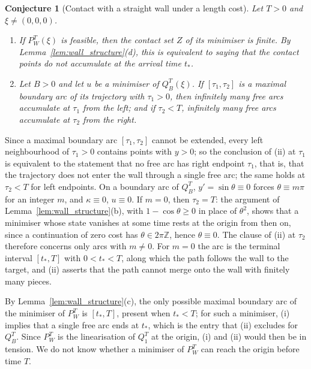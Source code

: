 \documentclass[11pt,reqno]{amsart}
\newtheorem{conjecture}[theorem]{Conjecture}
\theoremstyle{definition}
\numberwithin{equation}{section}
\begin{document}
\begin{conjecture}[Contact with a straight wall under a length cost]
\label{conj:wall_contact}
Let $T>0$ and $\xi\ne(0,0,0)$.
\begin{enumerate}
\item[(i)] If $P_W^T(\xi)$ is feasible, then the contact set $Z$ of its minimiser is finite. By
  Lemma~\ref{lem:wall_structure}(d), this is equivalent to saying that the contact points do not
  accumulate at the arrival time $t_*$.
\item[(ii)] Let $B>0$ and let $u$ be a minimiser of $Q_B^T(\xi)$. If $[\tau_1,\tau_2]$ is a
  \emph{maximal} boundary arc of its trajectory with $\tau_1>0$, then infinitely many free arcs
  accumulate at $\tau_1$ from the left; and if $\tau_2<T$, infinitely many free arcs accumulate at
  $\tau_2$ from the right.
\end{enumerate}
\end{conjecture}

Since a maximal boundary arc $[\tau_1,\tau_2]$ cannot be extended, every left neighbourhood of
$\tau_1>0$ contains points with $y>0$; so the conclusion of (ii) at $\tau_1$ is equivalent to the
statement that no free arc has right endpoint $\tau_1$, that is, that the trajectory does not enter the
wall through a single free arc; the same holds at $\tau_2<T$ for left endpoints. On a boundary arc of
$Q_B^T$, $y'=\sin\theta\equiv0$ forces $\theta\equiv m\pi$ for an integer $m$, and $\kappa\equiv0$,
$u\equiv0$. If $m=0$, then $\tau_2=T$: the argument of Lemma~\ref{lem:wall_structure}(b), with
$1-\cos\theta\ge0$ in place of $\theta^2$, shows that a minimiser whose state vanishes at some time
rests at the origin from then on, since a continuation of zero cost has $\theta\in2\pi\mathbb{Z}$,
hence $\theta\equiv0$. The clause of (ii) at $\tau_2$ therefore concerns only arcs with $m\ne0$. For
$m=0$ the arc is the terminal interval $[t_*,T]$ with $0<t_*<T$, along which the path follows the wall
to the target, and (ii) asserts that the path cannot merge onto the wall with finitely many pieces.

By Lemma~\ref{lem:wall_structure}(c), the only possible maximal boundary arc of the minimiser of
$P_W^T$ is $[t_*,T]$, present when $t_*<T$; for such a minimiser, (i) implies that a single free arc
ends at $t_*$, which is the entry that (ii) excludes for $Q_B^T$. Since $P_W^T$ is the linearisation
of $Q_1^T$ at the origin, (i) and (ii) would then be in tension. We do not know whether a minimiser of
$P_W^T$ can reach the origin before time $T$.
\end{document}
